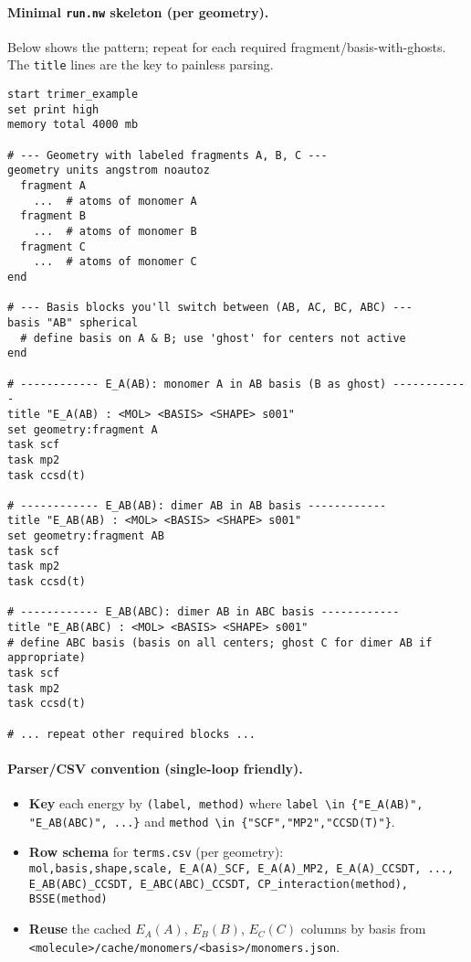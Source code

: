 \paragraph{Minimal \texttt{run.nw} skeleton (per geometry).}
Below shows the pattern; repeat for each required fragment/basis-with-ghosts.
The \texttt{title} lines are the key to painless parsing.
\begin{verbatim}
start trimer_example
set print high
memory total 4000 mb

# --- Geometry with labeled fragments A, B, C ---
geometry units angstrom noautoz
  fragment A
    ...  # atoms of monomer A
  fragment B
    ...  # atoms of monomer B
  fragment C
    ...  # atoms of monomer C
end

# --- Basis blocks you'll switch between (AB, AC, BC, ABC) ---
basis "AB" spherical
  # define basis on A & B; use 'ghost' for centers not active
end

# ------------ E_A(AB): monomer A in AB basis (B as ghost) ------------
title "E_A(AB) : <MOL> <BASIS> <SHAPE> s001"
set geometry:fragment A
task scf
task mp2
task ccsd(t)

# ------------ E_AB(AB): dimer AB in AB basis ------------
title "E_AB(AB) : <MOL> <BASIS> <SHAPE> s001"
set geometry:fragment AB
task scf
task mp2
task ccsd(t)

# ------------ E_AB(ABC): dimer AB in ABC basis ------------
title "E_AB(ABC) : <MOL> <BASIS> <SHAPE> s001"
# define ABC basis (basis on all centers; ghost C for dimer AB if appropriate)
task scf
task mp2
task ccsd(t)

# ... repeat other required blocks ...
\end{verbatim}

\paragraph{Parser/CSV convention (single-loop friendly).}
\begin{itemize}[leftmargin=2em]
  \item \textbf{Key} each energy by \verb|(label, method)| where
        \verb|label \in {"E_A(AB)", "E_AB(ABC)", ...}| and
        \verb|method \in {"SCF","MP2","CCSD(T)"}|.
  \item \textbf{Row schema} for \texttt{terms.csv} (per geometry):\\
  \texttt{mol,basis,shape,scale, E\_A(A)\_SCF, E\_A(A)\_MP2, E\_A(A)\_CCSDT, ..., E\_AB(ABC)\_CCSDT, E\_ABC(ABC)\_CCSDT, CP\_interaction(method), BSSE(method)}
  \item \textbf{Reuse} the cached $E_A(A)$, $E_B(B)$, $E_C(C)$ columns by basis from\\
        \texttt{<molecule>/cache/monomers/<basis>/monomers.json}.
\end{itemize}

